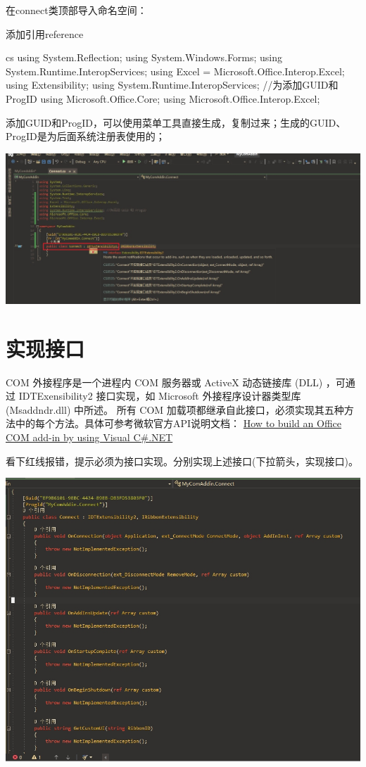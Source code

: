 \documentclass[math,code]{amznotes}
\begin{document}
	在connect类顶部导入命名空间：
	\begin{codebox}{添加引用}{reference}
		\begin{amzcode}{cs}
			using System.Reflection;
			using System.Windows.Forms;
			using System.Runtime.InteropServices;
			using Excel = Microsoft.Office.Interop.Excel;
			using Extensibility;
			using System.Runtime.InteropServices; //为添加GUID和ProgID
			using Microsoft.Office.Core;
			using Microsoft.Office.Interop.Excel;
		\end{amzcode}
	\end{codebox}
	添加GUID和ProgID，可以使用菜单工具直接生成，复制过来；生成的GUID、ProgID是为后面系统注册表使用的；
	
	\includegraphics[width=0.9\linewidth]{pic/com_api}
	
	\section{实现接口}
	COM 外接程序是一个进程内 COM 服务器或 ActiveX 动态链接库 (DLL) ，可通过 IDTExensibility2 接口实现，如 Microsoft 外接程序设计器类型库 (Msaddndr.dll) 中所述。 所有 COM 加载项都继承自此接口，必须实现其五种方法中的每个方法。具体可参考微软官方API说明文档\cite{vst_comaddin}：
	\href{https://learn.microsoft.com/en-us/previous-versions/office/troubleshoot/office-developer/office-com-add-in-using-visual-c}{How to build an Office COM add-in by using Visual C\#.NET}
	
	看下红线报错，提示必须为接口实现。分别实现上述接口(下拉箭头，实现接口)。
	
	\includegraphics[width=0.9\linewidth]{pic/implement}
	
\end{document}
